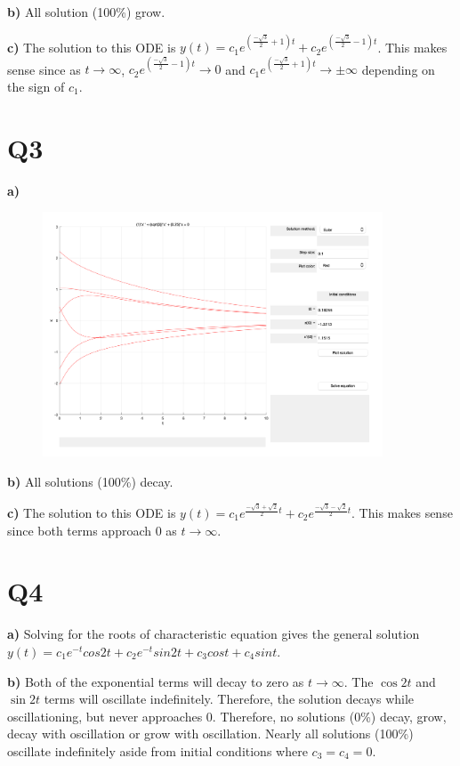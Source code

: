 \documentclass[12pt]{article}
\begin{document}
\textbf{b)}
All solution (100\%) grow.

\textbf{c)}
The solution to this ODE is $y(t) = c_1e^{(\frac{-\sqrt{3}}{2} + 1)t} + c_2e^{(\frac{-\sqrt{3}}{2} - 1)t}$. This makes sense since as $t \rightarrow \infty$, $c_2e^{(\frac{-\sqrt{3}}{2} - 1)t} \rightarrow 0$ and $c_1e^{(\frac{-\sqrt{3}}{2} + 1)t} \rightarrow \pm \infty$ depending on the sign of $c_1$.


\section*{Q3}
\textbf{a)}
\begin{figure}[H]
    \centering
    \includegraphics[width=0.9\textwidth]{images/q3.png}
\end{figure}

\textbf{b)}
All solutions (100\%) decay.

\textbf{c)}
The solution to this ODE is $y(t) = c_1e^{\frac{-\sqrt{3}+\sqrt{2}}{2}t} + c_2e^{\frac{-\sqrt{3}-\sqrt{2}}{2}t}$. This makes sense since both terms approach 0 as $t \rightarrow \infty$.

\section*{Q4}
\textbf{a)}
Solving for the roots of characteristic equation gives the general solution $y(t) = c_1e^{-t}cos 2t + c_2e^{-t}sin 2t + c_3cos t + c_4sin t$.

\textbf{b)}
Both of the exponential terms will decay to zero as $t \rightarrow \infty$. The $\cos 2t$ and $\sin 2t$ terms will oscillate indefinitely. Therefore, the solution decays while oscillationing, but never approaches 0.
Therefore, no solutions (0\%) decay, grow, decay with oscillation or grow with oscillation. Nearly all solutions (100\%) oscillate indefinitely aside from initial conditions where $c_3 = c_4 = 0$.
\end{document}
